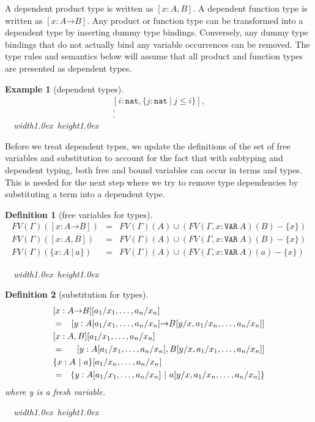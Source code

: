 \documentclass [12pt,twoside]{cslreport}
\newcommand{\thmbox}
   {{\ \hfill\hbox{%
      \vrule width1.0ex height1.0ex
   }\parfillskip 0pt }}
\newtheorem{example}[thm]{Example}
\newcommand{\aro}{\mathord\rightarrow} %
\newcommand{\union}{\cup}
\newcommand{\funtype}[2]{[#1 \aro #2]}
\newcommand{\tupletype}[1]{[#1]}
\newcommand{\ttbool}{\mathtt{bool}}
\newcommand{\ttvar}{\mathtt{VAR}}
\newcommand{\ttvariable}{\mathtt{VARIABLE}}
\newcommand{\ttint}{\mathtt{int}}
\newcommand{\ttnat}{\mathtt{nat}}
\newcommand{\itkind}{\textit{kind}}
\newcommand{\vbar}{\ |\ }
\newenvironment{Eg}[1]{\begin{example}[#1]\label{eg:#1}\em }{\thmbox\end{example}}
\newtheorem{definition}{Definition}
\newenvironment{Defn}[1]{\begin{definition}[#1]\label{defn:#1}}{
\thmbox\end{definition}}
\begin{document}
\begin{comment}
Let $V$ be a metavariable that ranges over types or {\em
type bindings\/} of the form $x : T$.
\end{comment}
A dependent product type is
written as $\tupletype{x : A, B}$.  A dependent function type is written
as $\funtype{x : A}{B}$.
Any product or function type can be transformed into a dependent type by
inserting dummy type bindings.  Conversely, any dummy type bindings that
do not actually bind any variable occurrences can be
removed.  The type rules and semantics below will assume that all product and
function types are presented as dependent types.

\begin{Eg}{dependent types}
$$
\begin{array}{l}
\tupletype{i : \ttnat, \{j: \ttnat \vbar j\leq i\}}, \\
\tupletype{i : \ttnat, \funtype{\{j: \ttnat \vbar j\leq i\}}{\ttbool}},\\
\funtype{i: \ttint}{\{j : \ttint \vbar i\leq j\}}.
\end{array}$$
\end{Eg}


Before we treat dependent types, we update the definitions of the set
of free variables and substitution to account for the fact that
with subtyping and dependent typing, both free and bound variables
can occur in terms and types.  This is needed for the next step
where we try to remove type dependencies by substituting a term into
a dependent type.  
\begin{Defn}{free variables for types}
\begin{eqnarray*}
FV(\Gamma)(\funtype{x : A}{B}) & = & FV(\Gamma)(A)\union
                   (FV(\Gamma, x: \ttvar~A)(B) - \{x\}) \\
%
FV(\Gamma)(\tupletype{x: A, B}) & = &
  FV(\Gamma)(A)\union (FV(\Gamma,
x:\ttvar~A)(B) - \{ x\}) \\
%
FV(\Gamma)(\{x : A \vbar a\}) & = & FV(\Gamma)(A) \union
(FV(\Gamma, x:\ttvar~A)(a) - \{x\})
\end{eqnarray*}
\end{Defn}

\begin{Defn}{substitution for types}
\begin{eqnarray*}
\lefteqn{\funtype{x : A}{B}[a_1/x_1,\ldots, a_n/x_n]}\\ & = & \funtype{y :
A[a_1/x_1,\ldots,a_n/x_n]}{B[y/x, a_1/x_n, \ldots, a_n/x_n]} \\
%
\lefteqn{\tupletype{x: A, B}[a_1/x_1, \ldots, a_n/x_n]}\\ & = &
\tupletype{y: A[a_1/x_1,\ldots, a_n/x_n], 
B[y/x, a_1/x_1,\ldots,a_n/x_n]} \\
%
\lefteqn{\{x : A\vbar a\}[a_1/x_n,\ldots, a_n/x_n]}\\ & = & \{y : A[a_1/x_1,\ldots,
a_n/x_n] \vbar  a[y/x, a_1/x_n, \ldots, a_n/x_n] \}
\end{eqnarray*}
where y is a fresh variable.
\end{Defn}
\end{document}
